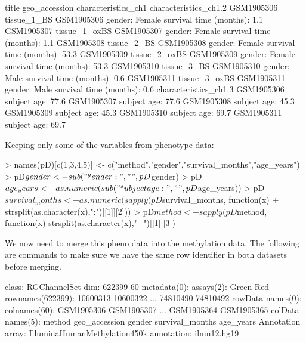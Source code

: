 \documentclass{article}
\begin{document}
\begin{Schunk}
\begin{Soutput}
                   title geo_accession characteristics_ch1        characteristics_ch1.2
GSM1905306   tissue_1_BS    GSM1905306      gender: Female  survival time (months): 1.1
GSM1905307 tissue_1_oxBS    GSM1905307      gender: Female  survival time (months): 1.1
GSM1905308   tissue_2_BS    GSM1905308      gender: Female survival time (months): 53.3
GSM1905309 tissue_2_oxBS    GSM1905309      gender: Female survival time (months): 53.3
GSM1905310   tissue_3_BS    GSM1905310        gender: Male  survival time (months): 0.6
GSM1905311 tissue_3_oxBS    GSM1905311        gender: Male  survival time (months): 0.6
           characteristics_ch1.3
GSM1905306     subject age: 77.6
GSM1905307     subject age: 77.6
GSM1905308     subject age: 45.3
GSM1905309     subject age: 45.3
GSM1905310     subject age: 69.7
GSM1905311     subject age: 69.7
\end{Soutput}
\end{Schunk}

Keeping only some of the variables from phenotype data:
\begin{Schunk}
\begin{Sinput}
> names(pD)[c(1,3,4,5)] <- c("method","gender","survival_months","age_years")
> pD$gender <- sub("^gender: ", "", pD$gender)
> pD$age_years <- as.numeric(sub("^subject age: ", "", pD$age_years))
> pD$survival_months <- as.numeric(sapply(pD$survival_months, function(x)
+   strsplit(as.character(x),":")[[1]][2]))
> pD$method <- sapply(pD$method, function(x) strsplit(as.character(x),"_")[[1]][3])
\end{Sinput}
\end{Schunk}

We now need to merge this pheno data into the methylation data. The following are commands to make sure we have the same row identifier in both datasets before merging.

\begin{Schunk}
\begin{Soutput}
class: RGChannelSet 
dim: 622399 60 
metadata(0):
assays(2): Green Red
rownames(622399): 10600313 10600322 ... 74810490 74810492
rowData names(0):
colnames(60): GSM1905306 GSM1905307 ... GSM1905364 GSM1905365
colData names(5): method geo_accession gender survival_months age_years
Annotation
  array: IlluminaHumanMethylation450k
  annotation: ilmn12.hg19
\end{Soutput}
\end{Schunk}
\end{document}

